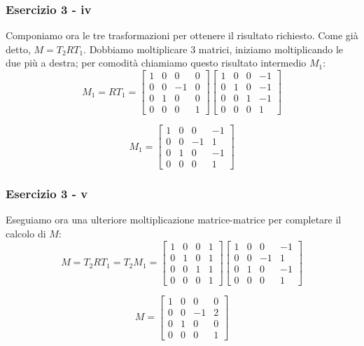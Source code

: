 \documentclass{beamer}
\begin{document}
\begin{frame}
\frametitle{Esercizio 3 - iv}
Componiamo ora le tre trasformazioni per ottenere il risultato richiesto. Come gi\`a detto, $M = T_2 R T_1$.
Dobbiamo moltiplicare 3 matrici, iniziamo moltiplicando le due pi\`u a destra;
    per comodit\`a chiamiamo questo risultato intermedio $M_1$:
\begin{displaymath}
M_1    
    =
    R T_1
    =
\begin{bmatrix}
    1 & 0 &  0 & 0 \\
    0 & 0 & -1 & 0\\
    0 & 1 &  0 & 0\\ 
    0 & 0 &  0 & 1
\end{bmatrix}
\begin{bmatrix}
        1 & 0 & 0 & -1 \\
        0 & 1 & 0 & -1 \\
        0 & 0 & 1 & -1 \\
        0 & 0 & 0 & 1 
\end{bmatrix}
\end{displaymath}

    \begin{displaymath}
   M_1 = 
\begin{bmatrix}
    1 & 0 &  0 & -1 \\
    0 & 0 & -1 &  1 \\
    0 & 1 &  0 & -1 \\ 
    0 & 0 &  0 &  1
\end{bmatrix}
\end{displaymath}
\end{frame}

\begin{frame}
\frametitle{Esercizio 3 - v}
Eseguiamo ora una ulteriore moltiplicazione matrice-matrice per completare il calcolo di $M$:
\begin{displaymath}
M    
    =
    T_2 R T_1
    =
    T_2 M_1
    =
\begin{bmatrix}
    1 & 0 &  0 & 1 \\
    0 & 1 &  0 & 1 \\
    0 & 0 &  1 & 1 \\ 
    0 & 0 &  0 & 1
\end{bmatrix}
\begin{bmatrix}
    1 & 0 &  0 & -1 \\
    0 & 0 & -1 &  1 \\
    0 & 1 &  0 & -1 \\ 
    0 & 0 &  0 &  1
\end{bmatrix}
\end{displaymath}

    \begin{displaymath}
   M = 
\begin{bmatrix}
    1 & 0 &  0 &  0 \\
    0 & 0 & -1 &  2 \\
    0 & 1 &  0 &  0 \\ 
    0 & 0 &  0 &  1
\end{bmatrix}
\end{displaymath}
\end{frame}
\end{document}
